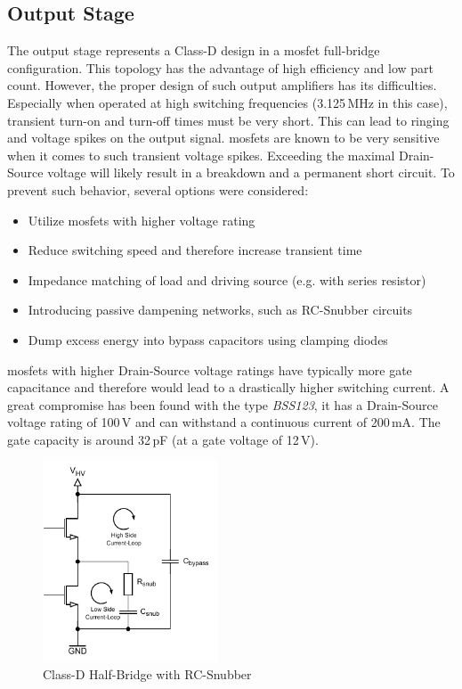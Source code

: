 \subsection{Output Stage}
The output stage represents a Class-D design in a \acrshort{mosfet} full-bridge configuration. This topology has the advantage of high efficiency and low part count. However, the proper design of such output amplifiers has its difficulties. Especially when operated at high switching frequencies (3.125\,MHz in this case), transient turn-on and turn-off times must be very short. This can lead to ringing and voltage spikes on the output signal.
\acrshort{mosfet}s are known to be very sensitive when it comes to such transient voltage spikes. Exceeding the maximal Drain-Source voltage will likely result in a breakdown and a permanent short circuit. To prevent such behavior, several options were considered:

\begin{itemize}
    \item Utilize \acrshort{mosfet}s with higher voltage rating
    \item Reduce switching speed and therefore increase transient time
    \item Impedance matching of load and driving source (e.g. with series resistor)
    \item Introducing passive dampening networks, such as RC-Snubber circuits
    \item Dump excess energy into bypass capacitors using clamping diodes
\end{itemize}
\newpage

\acrshort{mosfet}s with higher Drain-Source voltage ratings have typically more gate capacitance and therefore would lead to a drastically higher switching current. A great compromise has been found with the type \textit{BSS123}, it has a Drain-Source voltage rating of 100\,V and can withstand a continuous current of 200\,mA. The gate capacity is around 32\,pF (at a gate voltage of 12\,V). 

\begin{figure}[h!]
	\centering
	\includegraphics[width=5.2cm]{images/4_Design/Hardware/Class D Snubber.pdf}
	\vspace{-0.2cm}
    \caption{Class-D Half-Bridge with RC-Snubber}
    \label{fig:rc-snubber}
\end{figure}

